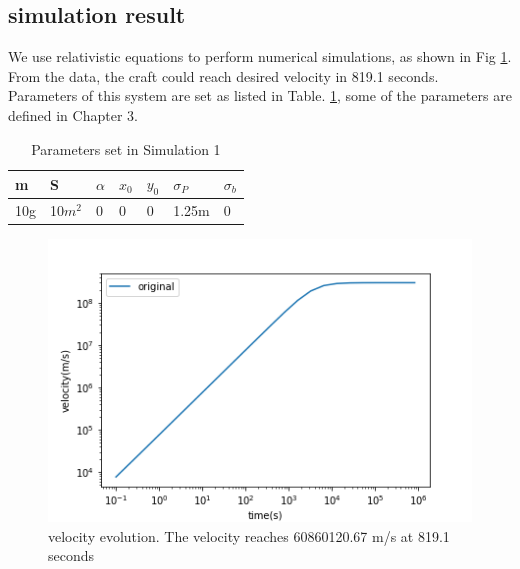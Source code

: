 \documentclass{article}
\begin{document}
\subsection{simulation result}
We use relativistic equations to perform numerical simulations, as shown in Fig \ref{sim1}. From the data, the craft could reach desired velocity in 819.1 seconds. Parameters of this system are set as listed in Table. \ref{par1}, some of the parameters are defined in Chapter 3.

\begin{table}[!htb]
	\centering
	\label{par1}
	\caption{Parameters set in Simulation 1}
	\begin{tabular}{lllllll}
		\toprule
		m	&S	&$\alpha$	&$x_0$	&$y_0$	&$\sigma_P$	&$\sigma_b$\\
		\midrule
		10g	&10$m^2$	&0	&0	&0	&1.25m	&0
		
	\end{tabular}
\end{table}

\begin{figure}[]
	\centering
	\includegraphics[width=12cm]{simu.png}
	
	\caption{velocity evolution. The velocity reaches 60860120.67 m/s at 819.1 seconds}
	\label{sim1}
\end{figure}
\end{document}
